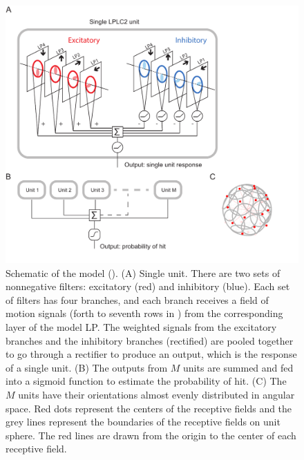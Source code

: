 \documentclass[pdftex,9pt,lineno]{elife}
\begin{document}
\begin{figure}
\includegraphics[width=\linewidth]{figures/model_sketch_paper.pdf}
\caption{Schematic of the model (). (A) Single unit. There are two sets of nonnegative filters: excitatory (red) and inhibitory (blue). Each set of filters has four branches, and each branch receives a field of motion signals (forth to seventh rows in ) from the corresponding layer of the model LP. The weighted signals from the excitatory branches and the inhibitory branches (rectified) are pooled together to go through a rectifier to produce an output, which is the response of a single unit. (B) The outputs from $M$ units are summed and fed into a sigmoid function to estimate the probability of hit. (C) The $M$ units have their orientations almost evenly distributed in angular space. Red dots represent the centers of the receptive fields and the grey lines represent the boundaries of the receptive fields on unit sphere. The red lines are drawn from the origin to the center of each receptive field.}
\label{fig:model}

\end{figure}
\end{document}
